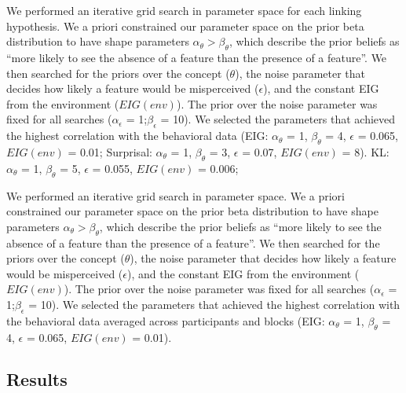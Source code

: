 \documentclass[10pt, letterpaper]{article}
\begin{document}
We performed an iterative grid search in parameter space for each
linking hypothesis. We a priori constrained our parameter space on the
prior beta distribution to have shape parameters
\(\alpha_{\theta} > \beta_{\theta}\), which describe the prior beliefs
as ``more likely to see the absence of a feature than the presence of a
feature''. We then searched for the priors over the concept
(\(\theta\)), the noise parameter that decides how likely a feature
would be misperceived (\(\epsilon\)), and the constant EIG from the
environment (\(EIG(env)\)). The prior over the noise parameter was fixed
for all searches (\(\alpha_{\epsilon}\) = 1;\(\beta_{\epsilon}\) = 10).
We selected the parameters that achieved the highest correlation with
the behavioral data (EIG: \(\alpha_{\theta}\) = 1, \(\beta_{\theta}\) =
4, \(\epsilon\) = 0.065, \(EIG(env)\) = 0.01; Surprisal:
\(\alpha_{\theta}\) = 1, \(\beta_{\theta}\) = 3, \(\epsilon\) = 0.07,
\(EIG(env)\) = 8). KL: \(\alpha_{\theta}\) = 1, \(\beta_{\theta}\) = 5,
\(\epsilon\) = 0.055, \(EIG(env)\) = 0.006;

We performed an iterative grid search in parameter space. We a priori
constrained our parameter space on the prior beta distribution to have
shape parameters \(\alpha_{\theta} > \beta_{\theta}\), which describe
the prior beliefs as ``more likely to see the absence of a feature than
the presence of a feature''. We then searched for the priors over the
concept (\(\theta\)), the noise parameter that decides how likely a
feature would be misperceived (\(\epsilon\)), and the constant EIG from
the environment (\(EIG(env)\)). The prior over the noise parameter was
fixed for all searches (\(\alpha_{\epsilon}\) = 1;\(\beta_{\epsilon}\) =
10). We selected the parameters that achieved the highest correlation
with the behavioral data averaged across participants and blocks (EIG:
\(\alpha_{\theta}\) = 1, \(\beta_{\theta}\) = 4, \(\epsilon\) = 0.065,
\(EIG(env)\) = 0.01).

\hypertarget{results-1}{%
\subsection{Results}\label{results-1}}
\end{document}
